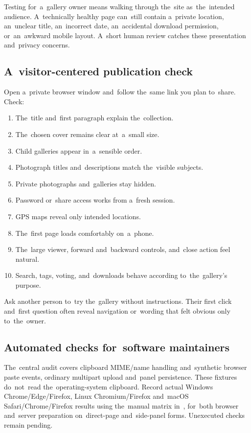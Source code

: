 \documentclass[11pt,a4paper]{article}
\newcommand{\filepath}[1]{\path{#1}}
\begin{document}
Testing for~a~gallery owner means walking through the~site as~the~intended
audience. A~technically healthy page can~still contain a~private location,
an~unclear title, an~incorrect date, an~accidental download permission,
or~an~awkward mobile layout. A~short human review catches these presentation
and~privacy concerns.

\subsection{A~visitor-centered publication check}

Open a~private browser window and~follow the~same link you plan to~share. Check:

\begin{enumerate}
  \item The~title and~first paragraph explain the~collection.
  \item The~chosen cover remains clear at~a~small size.
  \item Child galleries appear in~a~sensible order.
  \item Photograph titles and~descriptions match the~visible subjects.
  \item Private photographs and~galleries stay hidden.
  \item Password or~share access works from a~fresh session.
  \item GPS maps reveal only intended locations.
  \item The~first page loads comfortably on~a~phone.
  \item The~large viewer, forward and~backward controls, and~close action feel
  natural.
  \item Search, tags, voting, and~downloads behave according to~the~gallery's
  purpose.
\end{enumerate}

Ask another person to~try the~gallery without instructions. Their first click
and~first question often reveal navigation or~wording that felt obvious only
to~the~owner.

\subsection{Automated checks for~software maintainers}

The~central audit covers clipboard MIME/name handling and~synthetic browser
paste events, ordinary multipart upload and~panel persistence. These fixtures
do~not~read the~operating-system clipboard. Record actual Windows
Chrome/Edge/Firefox, Linux Chromium/Firefox and~macOS Safari/Chrome/Firefox
results using the~manual matrix in~\filepath{TESTING.md}, for~both browser
and~server preparation on~direct-page and~side-panel forms. Unexecuted checks
remain pending.
\end{document}
